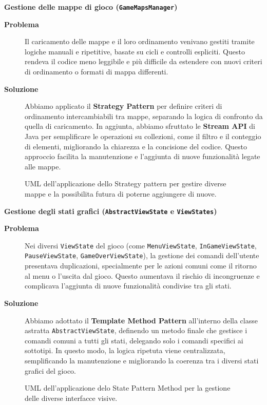 \documentclass[a4paper,12pt]{report}
\begin{document}
\newpage
\noindent
\textbf{Gestione delle mappe di gioco (\texttt{GameMapsManager})}
\begin{description}
	\item[\textbf{Problema}]
	      Il caricamento delle mappe e il loro ordinamento venivano gestiti tramite logiche manuali e ripetitive, basate su cicli e controlli espliciti. Questo rendeva il codice meno
	      leggibile e più difficile da estendere con nuovi criteri di ordinamento o formati di mappa differenti.

	\item[\textbf{Soluzione}]
	      Abbiamo applicato il \textbf{Strategy Pattern} per definire criteri di ordinamento intercambiabili tra mappe, separando la logica di confronto da quella di caricamento. In
	      aggiunta, abbiamo sfruttato le \textbf{Stream API} di Java per semplificare le operazioni su collezioni, come il filtro e il conteggio di elementi, migliorando la chiarezza e
	      la concisione del codice. Questo approccio facilita la manutenzione e l'aggiunta di nuove funzionalità legate alle mappe.
\end{description}
\begin{figure}[H]
	\centering{}
	
	\caption{UML dell'applicazione dello Strategy pattern per gestire diverse mappe e la possibilita futura di poterne aggiungere di nuove.}
	\label{img:GameMapsManager}
\end{figure}
\newpage
\noindent
\textbf{Gestione degli stati grafici (\texttt{AbstractViewState} e \texttt{ViewStates})}
\begin{description}
	\item[\textbf{Problema}]
	      Nei diversi \texttt{ViewState} del gioco (come \texttt{MenuViewState}, \newline \texttt{InGameViewState}, \texttt{PauseViewState}, \texttt{GameOverViewState}), la gestione dei
	      comandi dell'utente presentava duplicazioni, specialmente per le azioni comuni come il ritorno al menu o l'uscita dal gioco. Questo aumentava il rischio di incongruenze e
	      complicava l'aggiunta di nuove funzionalità condivise tra gli stati.

	\item[\textbf{Soluzione}]
	      Abbiamo adottato il \textbf{Template Method Pattern} all'interno della classe astratta \texttt{AbstractViewState}, definendo un metodo finale che gestisce i comandi comuni a tutti
	      gli stati,
	      delegando solo i comandi specifici ai sottotipi. In questo modo, la logica ripetuta viene centralizzata, semplificando la manutenzione e migliorando la coerenza tra i diversi
	      stati grafici del gioco.
\end{description}
\begin{figure}[H]
	\centering{}
	
	\caption{UML dell'applicazione delo State Pattern Method per la gestione delle diverse interfacce visive.}
	\label{img:AbstractViewState}
\end{figure}
\newpage
\end{document}
